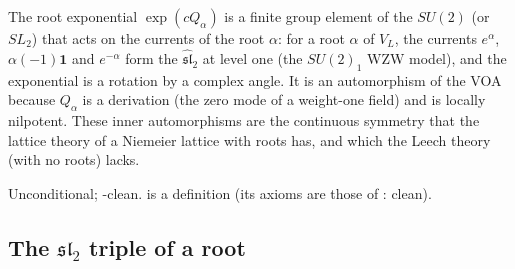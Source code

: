 \begin{physics}
The root exponential $\exp(cQ_\alpha)$ is a finite group element of the $SU(2)$ (or $SL_2$) that acts on the currents of the root $\alpha$: for a root $\alpha$ of $V_L$, the currents $e^{\alpha}$, $\alpha(-1)\mathbf 1$ and $e^{-\alpha}$ form the $\widehat{\mathfrak{sl}}_2$ at level one (the $SU(2)_1$ WZW model), and the exponential is a rotation by a complex angle. It is an automorphism of the VOA because $Q_\alpha$ is a derivation (the zero mode of a weight-one field) and is locally nilpotent. These inner automorphisms are the continuous symmetry that the lattice theory of a Niemeier lattice with roots has, and which the Leech theory (with no roots) lacks.
\end{physics}
\begin{status}Unconditional; -clean.   is a
definition (its axioms are those of : clean).\end{status}

\subsection{The \texorpdfstring{$\mathfrak{sl}_2$}{sl2} triple of a root}

